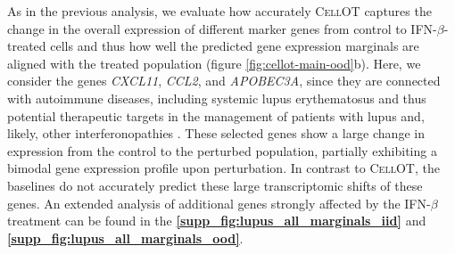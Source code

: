 As in the previous analysis, we evaluate how accurately \textsc{CellOT} captures the change in the overall expression of different marker genes from control to IFN-$\beta$-treated cells and thus how well the predicted gene expression marginals are aligned with the treated population (figure \ref{fig:cellot-main-ood}b). Here, we consider the genes \textit{CXCL11}, \textit{CCL2}, and \textit{APOBEC3A},
since they are connected with autoimmune diseases, including systemic lupus erythematosus \cite{hedrich2011epigenetic, perez2021sustained}
and thus potential therapeutic targets
in the management of patients with lupus and, likely, other interferonopathies \cite{mathian2015targeting,rani1996characterization,hedrich2011epigenetic,mathian2015targeting,perez2021sustained,flier2001differential}.
These selected genes show a large change in expression from the control to the perturbed population, partially exhibiting a bimodal gene expression profile upon perturbation. In contrast to \textsc{CellOT}, the baselines do not accurately predict these large transcriptomic shifts of these genes.
An extended analysis of additional genes strongly affected by the IFN-$\beta$ treatment can be found in the \textbf{\ref{supp_fig:lupus_all_marginals_iid}} and \textbf{\ref{supp_fig:lupus_all_marginals_ood}}.

